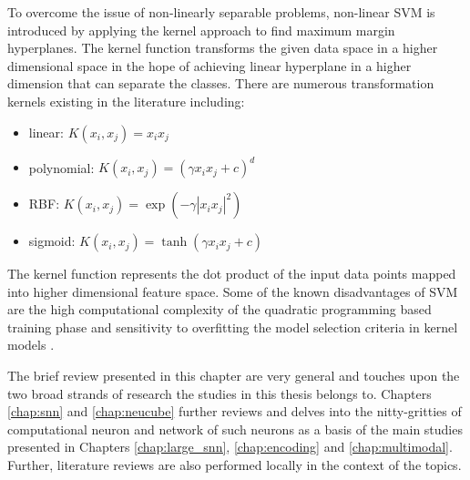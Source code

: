 \begin{enumerate}
	 To overcome the issue of non-linearly separable problems, non-linear SVM is introduced by applying the kernel approach to find maximum margin hyperplanes. The kernel function transforms the given data space in a higher dimensional space in the hope of achieving linear hyperplane in a higher dimension that can separate the classes. There are numerous transformation kernels existing in the literature including:
	  \begin{itemize}
		  \item linear: $K(x_i,x_j)=x_ix_j$
		  \item polynomial: $K(x_i,x_j)=(\gamma x_ix_j+c)^d$
		  \item RBF: $K(x_i,x_j)=\exp(-\gamma|x_ix_j|^2)$
		  \item sigmoid: $K(x_i,x_j)=\tanh(\gamma x_ix_j +c)$
	  \end{itemize}
	  The kernel function represents the dot product of the input data points mapped into higher dimensional feature space. Some of the known disadvantages of SVM are the high computational complexity of the quadratic programming based training phase \citep{horvath2003cmac} and sensitivity to overfitting the model selection criteria in kernel models \citep{cawley2010over}.

\end{enumerate}  


The brief review presented in this chapter are very general and touches upon the two broad strands of research the studies in this thesis belongs to. Chapters \ref{chap:snn} and \ref{chap:neucube} further reviews and delves into the nitty-gritties of computational neuron and network of such neurons as a basis of the main studies presented in Chapters \ref{chap:large_snn}, \ref{chap:encoding} and \ref{chap:multimodal}. Further, literature reviews are also performed locally in the context of the topics.
  





   
